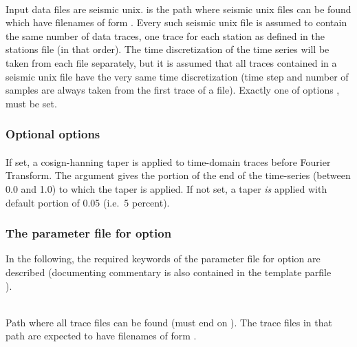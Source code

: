 \paragraph{}
Input data files are seismic unix.  is the path where seismic unix files can be found which 
have filenames of form . Every such seismic unix file is assumed to contain the same 
number of data traces, one trace for each station as defined in the \ASKI{} stations file (in that order).
The time discretization of the time series will be taken from each file separately, but it is assumed that
all traces contained in a seismic unix file have the very same time discretization (time step and number of samples
are always taken from the first trace of a file).
Exactly one of options ,  must be set.
\subsubsection{Optional options}
\paragraph{}
If set, a cosign-hanning taper is applied to time-domain traces before Fourier Transform. The argument 
 gives the portion of the end of the time-series (between 0.0 and 1.0) to which the
taper is applied. If not set, a taper \emph{is} applied with default portion of 0.05 (i.e.\ 5 percent).
\subsubsection{The parameter file for option }
In the following, the required keywords of the parameter file for option  are described 
(documenting commentary is also contained in the template parfile\\
).

\textbf{}\\
Path where all  trace files can be found (must end on \lcode{/}).
The trace files in that path are expected to have filenames of form  .

